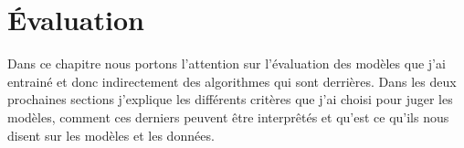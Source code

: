 \chapter{Évaluation}
\label{chapter5}
Dans ce chapitre nous portons l'attention sur l'évaluation des modèles que j'ai entrainé et donc indirectement des algorithmes qui sont derrières. Dans les deux prochaines sections j'explique les différents critères que j'ai choisi pour juger les modèles, comment ces derniers peuvent être interprêtés et qu'est ce qu'ils nous disent sur les modèles et les données. 




\clearpage